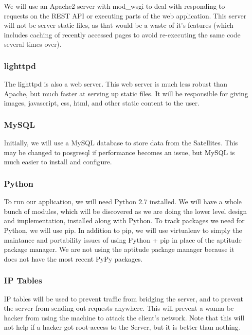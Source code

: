 We will use an Apache2 server with mod\_wsgi to deal with responding to requests on the REST API or executing parts of the web application.
This server will not be server static files, as that would be a waste of it's features (which includes caching of recently accessed pages to avoid re-executing the same code several times over).

\subsubsection{lighttpd}

The lighttpd is also a web server.
This web server is much less robust than Apache, but much faster at serving up static files.
It will be responsible for giving images, javascript, css, html, and other static content to the user.

\subsubsection{MySQL}

Initially, we will use a MySQL database to store data from the Satellites.
This may be changed to posgresql if performance becomes an issue, but MySQL is much easier to install and configure.

\subsubsection{Python}

To run our application, we will need Python 2.7 installed.
We will have a whole bunch of modules, which will be discovered as we are doing the lower level design and implementation, installed along with Python.
To track packages we need for Python, we will use pip.
In addition to pip, we will use virtualenv to simply the maintance and portability issues of using Python + pip in place of the aptitude package manager.
We are not using the aptitude package manager because it does not have the most recent PyPy packages.

\subsubsection{IP Tables}

IP tables will be used to prevent traffic from bridging the server, and to prevent the server from sending out requests anywhere.
This will prevent a wanna-be-hacker from using the machine to attack the client's network.
Note that this will not help if a hacker got root-access to the Server, but it is better than nothing.

